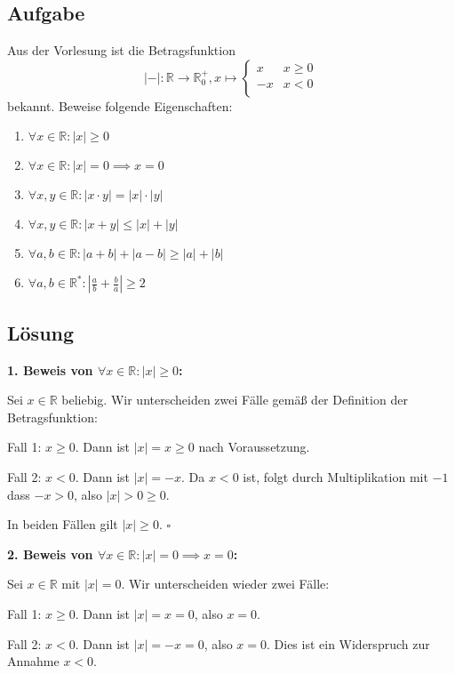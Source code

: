 \documentclass{article}
\newcommand{\abs}[1]{|#1|}
\newcommand{\R}{\mathbb{R}}
\newcommand{\fa}[1]{\forall #1 \colon}
\begin{document}
\subsection*{Aufgabe}
Aus der Vorlesung ist die Betragsfunktion 
\[
  \abs{{-}} \colon \R \to \R^{+}_{0}, x \mapsto
  \begin{cases}
    x  & x \geq 0 \\
    -x & x < 0    \\
  \end{cases}
\]
bekannt. Beweise folgende Eigenschaften:
\begin{enumerate}
\item \(\fa{x \in \mathbb{R}} \abs{x} \geq 0\)
\item \(\fa{x \in \R} \abs{x} = 0 \implies x = 0\)
\item \(\fa{x, y \in \R} \abs{x \cdot y} = \abs{x} \cdot \abs{y}\)
\item \(\fa{x, y \in \R} \abs{x + y} \leq \abs{x} + \abs{y}\)
\item \(\fa{a,b \in \R} \abs{a + b} + \abs{a - b} \geq \abs{a} + \abs{b}\)
\item \(\fa{a,b \in \R^*} \abs{\frac{a}{b} + \frac{b}{a}} \geq 2\)
\end{enumerate}

\subsection*{Lösung}

\textbf{1. Beweis von \(\fa{x \in \mathbb{R}} \abs{x} \geq 0\):}

Sei $x \in \R$ beliebig. Wir unterscheiden zwei Fälle gemäß der Definition der Betragsfunktion:

Fall 1: $x \geq 0$. Dann ist $\abs{x} = x \geq 0$ nach Voraussetzung.

Fall 2: $x < 0$. Dann ist $\abs{x} = -x$. Da $x < 0$ ist, folgt durch Multiplikation mit $-1$ dass $-x > 0$, also $\abs{x} > 0 \geq 0$.

In beiden Fällen gilt $\abs{x} \geq 0$. $\square$

\textbf{2. Beweis von \(\fa{x \in \R} \abs{x} = 0 \implies x = 0\):}

Sei $x \in \R$ mit $\abs{x} = 0$. Wir unterscheiden wieder zwei Fälle:

Fall 1: $x \geq 0$. Dann ist $\abs{x} = x = 0$, also $x = 0$.

Fall 2: $x < 0$. Dann ist $\abs{x} = -x = 0$, also $x = 0$. Dies ist ein Widerspruch zur Annahme $x < 0$.
\end{document}
